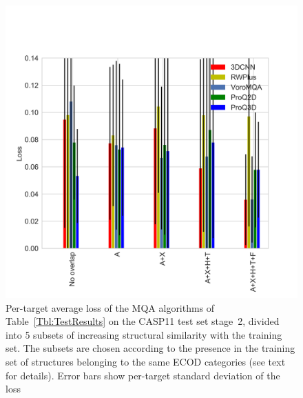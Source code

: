 \documentclass[letter,10pt]{article}
\begin{document}
\begin{figure}[H]
    \centering
    \includegraphics[width=\linewidth]{Fig/LossVsECOD.png}
%
    \caption{Per-target average loss of the MQA algorithms of Table~\ref{Tbl:TestResults}
    on the CASP11 test set stage~2, divided into 5 subsets of
    increasing structural similarity with the training set. The
    subsets are chosen according to the presence in the training set
    of structures belonging to the same ECOD categories (see text for
    details). Error bars show per-target standard deviation of the loss}
%
    \label{Fig:LossVsECOD}
\end{figure}
\end{document}
